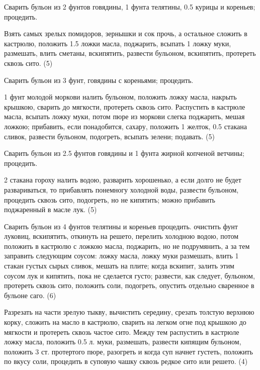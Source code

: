 Сварить бульон из 2 фунтов говядины, 1 фунта телятины, 0.5 курицы и кореньев; процедить.

Взять самых зрелых помидоров, зернышки и сок прочь, а остальное сложить в кастрюлю, положить 1.5 ложки масла, поджарить, всыпать 1 ложку муки, размешать, влить сметаны, вскипятить, развести бульоном, вскипятить, протереть сквозь сито. (5)


Сварить бульон из 3 фунт, говядины с кореньями; процедить.

1 фунт молодой моркови налить бульоном, положить ложку масла, накрыть крышкою, сварить до мягкости, протереть сквозь сито. Распустить в кастрюле масла, всыпать ложку муки, потом пюре из моркови слегка поджарить, мешая ложкою; прибавить, если понадобится, сахару, положить 1 желток, 0.5 стакана сливок, развести бульоном, подогреть, всыпать зелени; подавать. (5)


Сварить бульон из 2.5 фунтов говядины и 1 фунта жирной копченой ветчины; процедить.

2 стакана гороху налить водою, разварить хорошенько, а если долго не будет развариваться, то прибавлять понемногу холодной воды, развести бульоном, процедить сквозь сито, подогреть, но не кипятить; можно прибавить поджаренный в масле лук. (5)


Сварить бульон из 4 фунтов телятины и кореньев процедить. очистить фунт луковиц, вскипятить, откинуть на решето, перелить холодною водою, потом положить в кастрюлю с ложкою масла, поджарить, но не подрумянить, а за тем заправить следующим соусом: ложку масла, ложку муки размешать, влить 1 стакан густых сырых сливок, мешать на плите; когда вскипит, залить этим соусом лук и кипятить, пока не сделается густо; развести, как следует, бульоном, протереть сквозь сито, положить соли, подогреть, опустить отдельно сваренное в бульоне саго. (6)


Разрезать на части зрелую тыкву, вычистить середину, срезать толстую верхнюю корку, сложить на масло в кастрюлю, сварить на легком огне под крышкою до мягкости и протереть сквозь частое сито. Между тем распустить в кастрюле ложку масла, положить 0.5 л. муки, размешать, развести кипящим бульоном, положить 3 ст. протертого пюре, разогреть и когда суп начнет густеть, положить по вкусу соли, процедить в суповую чашку сквозь редкое сито или решето. (4)


